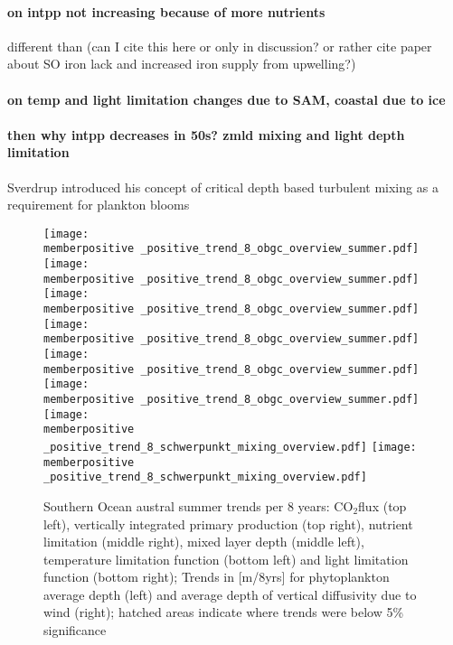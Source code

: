 \documentclass[12pt]{article}
\newcommand{\memberpositive}{m178_1985_1992} %
\begin{document}
\paragraph{on intpp not increasing because of more nutrients} different than \citep{Lovenduski2005} (can I cite this here or only in discussion? or rather cite paper about SO iron lack and increased iron supply from upwelling?)

\paragraph{on temp and light limitation changes due to SAM, coastal due to ice}

\paragraph{then why intpp decreases in 50s? zmld mixing and light depth limitation} Sverdrup \citep{Sverdrup1953} introduced his concept of critical depth based turbulent mixing as a requirement for plankton blooms \citep{Franks2014}

\begin{figure}[h!]
	\texttt{[image: \\memberpositive \_positive\_trend\_8\_obgc\_overview\_summer.pdf]} %
	\texttt{[image: \\memberpositive \_positive\_trend\_8\_obgc\_overview\_summer.pdf]} %
	\texttt{[image: \\memberpositive \_positive\_trend\_8\_obgc\_overview\_summer.pdf]} %
	\texttt{[image: \\memberpositive \_positive\_trend\_8\_obgc\_overview\_summer.pdf]} %
	\texttt{[image: \\memberpositive \_positive\_trend\_8\_obgc\_overview\_summer.pdf]} %
	\texttt{[image: \\memberpositive \_positive\_trend\_8\_obgc\_overview\_summer.pdf]} %
	\texttt{[image: \\memberpositive \_positive\_trend\_8\_schwerpunkt\_mixing\_overview.pdf]} %
	\hspace{3.5cm}
	\texttt{[image: \\memberpositive \_positive\_trend\_8\_schwerpunkt\_mixing\_overview.pdf]} %
	\caption{Southern Ocean austral summer trends per 8 years: CO$_2$flux (top left), vertically integrated primary production (top right), nutrient limitation (middle right), mixed layer depth (middle left), temperature limitation function (bottom left) and light limitation function (bottom right); Trends in [m/8yrs] for phytoplankton average depth (left) and average depth of vertical diffusivity due to wind (right); hatched areas indicate where trends were below 5\% significance}
	\label{fig:co2flux_intpp_neg}
\end{figure}
\end{document}
